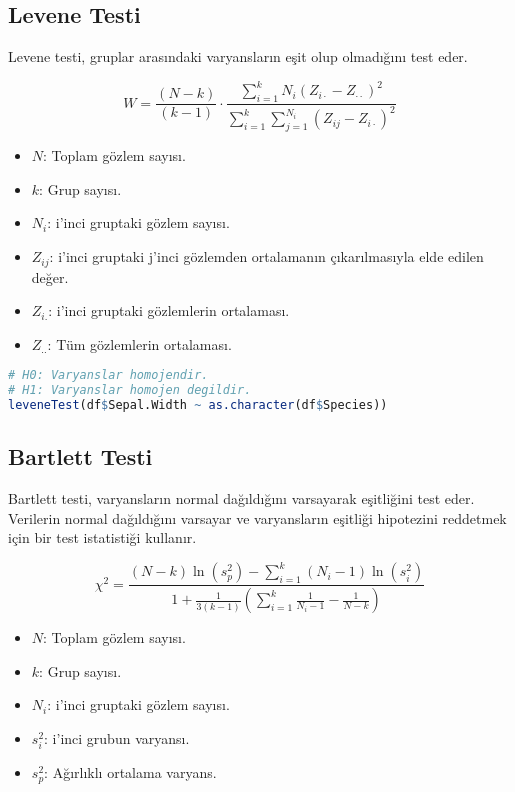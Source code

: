 \subsection{Levene Testi}
Levene testi, gruplar arasındaki varyansların eşit olup olmadığını test eder.

\[
W = \frac{(N - k)}{(k - 1)} \cdot \frac{\sum_{i=1}^{k} N_i (Z_{i \cdot} - Z_{\cdot \cdot})^2}{\sum_{i=1}^{k} \sum_{j=1}^{N_i} (Z_{ij} - Z_{i \cdot})^2}
\]

\begin{itemize}
	\item $N$: Toplam gözlem sayısı.
	\item $k$: Grup sayısı.
	\item $N_i$: i'inci gruptaki gözlem sayısı.
	\item $Z_{ij}$: i'inci gruptaki j'inci gözlemden ortalamanın çıkarılmasıyla elde edilen değer.
	\item $Z_{i.}$: i'inci gruptaki gözlemlerin ortalaması.
	\item $Z_{..}$: Tüm gözlemlerin ortalaması.
\end{itemize}

\begin{lstlisting}[language=R]
# H0: Varyanslar homojendir.
# H1: Varyanslar homojen degildir.
leveneTest(df$Sepal.Width ~ as.character(df$Species))
\end{lstlisting}


\subsection{Bartlett Testi}
Bartlett testi, varyansların normal dağıldığını varsayarak eşitliğini test eder. Verilerin normal dağıldığını varsayar ve varyansların eşitliği hipotezini reddetmek için bir test istatistiği kullanır.

\[
\chi^2 = \frac{(N - k) \ln(s_p^2) - \sum_{i=1}^{k} (N_i - 1) \ln(s_i^2)}{1 + \frac{1}{3(k-1)} \left( \sum_{i=1}^{k} \frac{1}{N_i - 1} - \frac{1}{N - k} \right)}
\]

\begin{itemize}
	\item $N$: Toplam gözlem sayısı.
	\item $k$: Grup sayısı.
	\item $N_i$: i'inci gruptaki gözlem sayısı.
	\item $s_i^2$: i'inci grubun varyansı.
	\item $s_p^2$: Ağırlıklı ortalama varyans.
\end{itemize}

